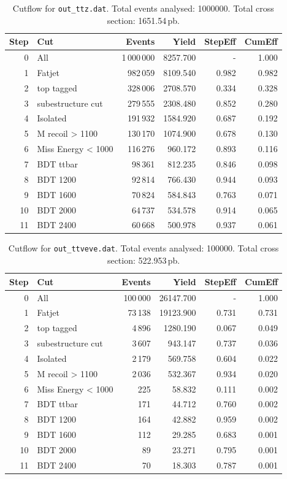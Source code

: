 \documentclass{article}
\begin{document}
\begin{table}[ht]
\centering
\begin{tabular}{r l r r r r}
\toprule
Step & Cut & Events & Yield & StepEff & CumEff \\
\midrule
0 & All & 1\,000\,000 & 8257.700 & - & 1.000 \\
1 & Fatjet & 982\,059 & 8109.540 & 0.982 & 0.982 \\
2 & top tagged & 328\,006 & 2708.570 & 0.334 & 0.328 \\
3 & subestructure cut & 279\,555 & 2308.480 & 0.852 & 0.280 \\
4 & Isolated & 191\,932 & 1584.920 & 0.687 & 0.192 \\
5 & M recoil > 1100 & 130\,170 & 1074.900 & 0.678 & 0.130 \\
6 & Miss Energy < 1000 & 116\,276 & 960.172 & 0.893 & 0.116 \\
7 & BDT ttbar & 98\,361 & 812.235 & 0.846 & 0.098 \\
8 & BDT 1200 & 92\,814 & 766.430 & 0.944 & 0.093 \\
9 & BDT 1600 & 70\,824 & 584.843 & 0.763 & 0.071 \\
10 & BDT 2000 & 64\,737 & 534.578 & 0.914 & 0.065 \\
11 & BDT 2400 & 60\,668 & 500.978 & 0.937 & 0.061 \\
\bottomrule
\end{tabular}
\caption{Cutflow for \texttt{out\_ttz.dat}. Total events analysed: 1000000. Total cross section: 1651.54\,pb.}
\label{tab:cutflow-out-ttz-dat}
\end{table}

\begin{table}[ht]
\centering
\begin{tabular}{r l r r r r}
\toprule
Step & Cut & Events & Yield & StepEff & CumEff \\
\midrule
0 & All & 100\,000 & 26147.700 & - & 1.000 \\
1 & Fatjet & 73\,138 & 19123.900 & 0.731 & 0.731 \\
2 & top tagged & 4\,896 & 1280.190 & 0.067 & 0.049 \\
3 & subestructure cut & 3\,607 & 943.147 & 0.737 & 0.036 \\
4 & Isolated & 2\,179 & 569.758 & 0.604 & 0.022 \\
5 & M recoil > 1100 & 2\,036 & 532.367 & 0.934 & 0.020 \\
6 & Miss Energy < 1000 & 225 & 58.832 & 0.111 & 0.002 \\
7 & BDT ttbar & 171 & 44.712 & 0.760 & 0.002 \\
8 & BDT 1200 & 164 & 42.882 & 0.959 & 0.002 \\
9 & BDT 1600 & 112 & 29.285 & 0.683 & 0.001 \\
10 & BDT 2000 & 89 & 23.271 & 0.795 & 0.001 \\
11 & BDT 2400 & 70 & 18.303 & 0.787 & 0.001 \\
\bottomrule
\end{tabular}
\caption{Cutflow for \texttt{out\_ttveve.dat}. Total events analysed: 100000. Total cross section: 522.953\,pb.}
\label{tab:cutflow-out-ttveve-dat}
\end{table}
\end{document}
